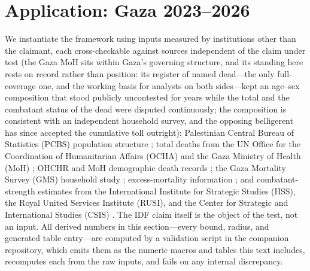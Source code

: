 \section{Application: Gaza 2023--2026}\label{sec:gaza}

We instantiate the framework using inputs measured by institutions other than the claimant, each cross-checkable against sources independent of the claim under test (the Gaza MoH sits within Gaza's governing structure, and its standing here rests on record rather than position: its register of named dead---the only full-coverage one, and the working basis for analysts on both sides---kept an age--sex composition that stood publicly uncontested for years while the total and the combatant status of the dead were disputed continuously; the composition is consistent with an independent household survey, and the opposing belligerent has since accepted the cumulative toll outright): Palestinian Central Bureau of Statistics (PCBS) population structure \citep{pcbs}; total deaths from the UN Office for the Coordination of Humanitarian Affairs (OCHA) and the Gaza Ministry of Health (MoH) \citep{ochaopt}; OHCHR and MoH demographic death records \citep{ohchr2024}; the Gaza Mortality Survey (GMS) household study \citep{spagatlgh2026}; excess-mortality information \citep{khatib2024,jamaluddine2025}; and combatant-strength estimates from the International Institute for Strategic Studies (IISS), the Royal United Services Institute (RUSI), and the Center for Strategic and International Studies (CSIS) \citep{iiss2024,rusi2024}. The IDF claim itself \citep{idfclaim} is the object of the test, not an input. All derived numbers in this section---every bound, radius, and generated table entry---are computed by a validation script in the companion repository, which emits them as the numeric macros and tables this text includes, recomputes each from the raw inputs, and fails on any internal discrepancy.

